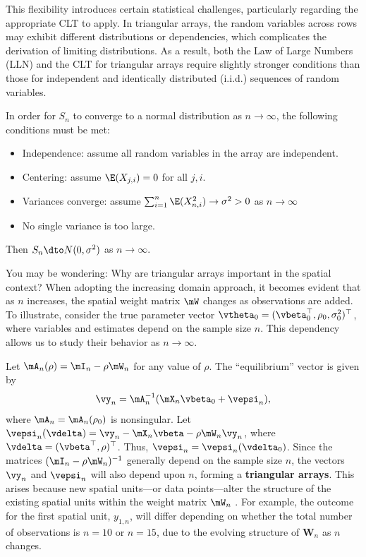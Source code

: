 \documentclass[english,12pt]{book}\usepackage[]{graphicx}\usepackage[]{xcolor}
\begin{document}
This flexibility introduces certain statistical challenges, particularly regarding the appropriate CLT to apply. In triangular arrays, the random variables across rows may exhibit different distributions or dependencies, which complicates the derivation of limiting distributions. As a result, both the Law of Large Numbers (LLN) and the CLT for triangular arrays require slightly stronger conditions than those for independent and identically distributed (i.i.d.) sequences of random variables.

In order for $S_n$ to converge to a normal distribution as $n \to \infty$, the following conditions must be met:
\begin{itemize}
  \item Independence: assume all random variables in the array are independent.
  \item Centering: assume $\E(X_{j,i}) = 0$ for all $j, i$.
  \item Variances converge: assume $\sum_{i = 1}^n\E(X_{n, i}^2)\to \sigma^2> 0$ as $n\to\infty$
  \item No single variance is too large.
\end{itemize}

Then $S_n \dto N(0, \sigma^2)$ as $n\to\infty$.

You may be wondering: Why are triangular arrays important in the spatial context? When adopting the increasing domain approach, it becomes evident that as $n$ increases, the spatial weight matrix  $\mW$ changes as observations are added. To illustrate, consider the true parameter vector  $\vtheta_0 = (\vbeta_0^\top, \rho_0, \sigma_0^2)^\top$, where variables and estimates depend on the sample size $n$. This dependency allows us to study their behavior as $n \to \infty$.

Let $\mA_n(\rho) = \mI_n - \rho \mW_n$ for any value of $\rho$. The ``equilibrium'' vector is given by
\begin{equation}\label{eq:equilibrium_slm}
\vy_n = \mA_n^{-1}(\mX_n\vbeta_0 + \vepsi_n), 
\end{equation}
%
where $\mA_n = \mA_n(\rho_0)$ is nonsingular. Let $\vepsi_n(\vdelta) = \vy_n - \mX_n\vbeta - \rho \mW_n\vy_n$, where $\vdelta = (\vbeta^\top, \rho)^\top$. Thus, $\vepsi_n = \vepsi_n(\vdelta_0)$. Since the matrices $(\mI_n - \rho\mW_n)^{-1}$ generally depend on the sample size $n$, the vectors $\vy_n$ and $\vepsi_n$ will also depend upon $n$, forming a \textbf{triangular arrays}. This arises because new spatial units---or data points---alter the structure of the existing spatial units within the weight matrix $\mW_n$ \citep[see for example][]{kelejian1999generalized, kelejian2001asymptotic, anselinSpatialEcon}. For example, the outcome for the first spatial unit, $y_{1,n}$, will differ depending on whether the total number of observations is $n=10$ or $n=15$, due to the evolving structure of $\mathbf{W}_n$ as $n$ changes.
\end{document}
